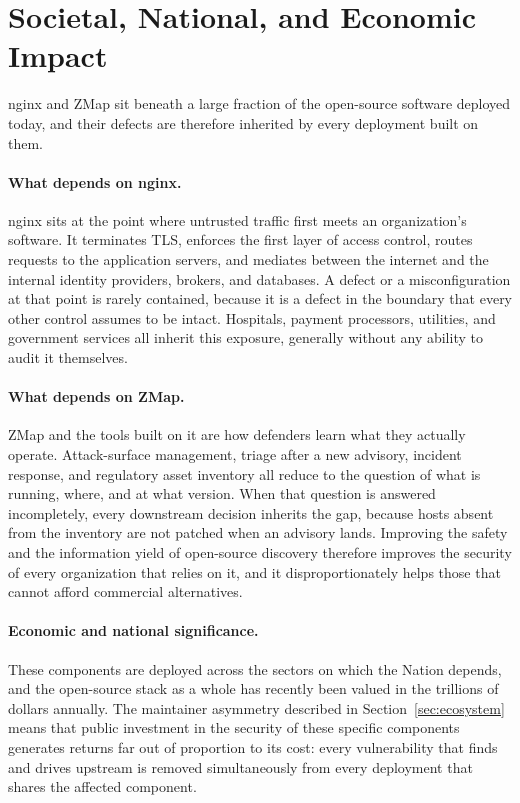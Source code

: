 \section{Societal, National, and Economic Impact}
\label{sec:impact}

nginx and ZMap sit beneath a large fraction of the open-source software
deployed today, and their defects are therefore inherited by every deployment
built on them.

\paragraph{What depends on nginx.}
nginx sits at the point where untrusted traffic first meets an
organization's software. It terminates TLS, enforces the first layer of
access control, routes requests to the application servers, and mediates
between the internet and the internal identity providers, brokers, and
databases. A defect or a misconfiguration at that point is rarely contained,
because it is a defect in the boundary that every other control assumes to be
intact. Hospitals, payment processors, utilities, and government services all
inherit this exposure, generally without any ability to audit it themselves.

\paragraph{What depends on ZMap.}
ZMap and the tools built on it are how defenders learn what they actually
operate. Attack-surface management, triage after a new advisory, incident
response, and regulatory asset inventory all reduce to the question of what
is running, where, and at what version. When that question is answered incompletely, every downstream decision
inherits the gap, because hosts absent from the inventory are not patched when
an advisory lands. Improving the safety and the
information yield of open-source discovery therefore improves the security of
every organization that relies on it, and it disproportionately helps those
that cannot afford commercial alternatives.

\paragraph{Economic and national significance.}
These components are deployed across the sectors on which the Nation depends,
and the open-source stack as a whole has recently been valued in the
trillions of dollars annually. The maintainer asymmetry described in
Section~\ref{sec:ecosystem} means that public investment in the security of
these specific components generates returns far out of proportion to its cost:
every vulnerability that \sysname finds and drives upstream is removed
simultaneously from every deployment that shares the affected component.

